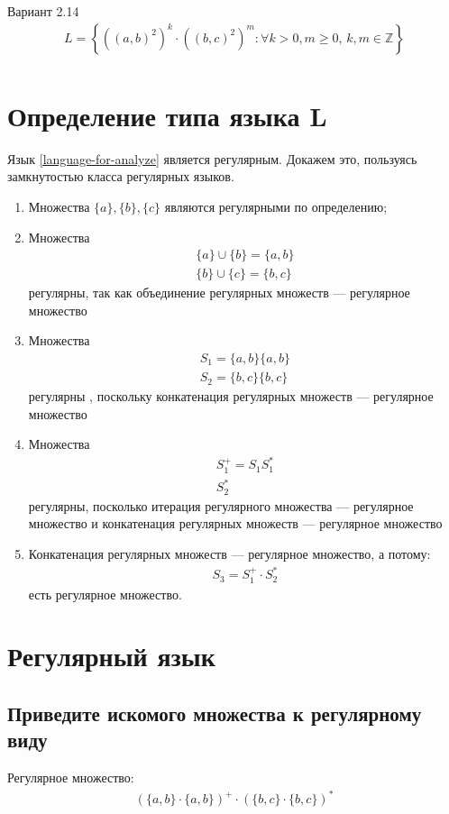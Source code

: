 Вариант 2.14
\begin{align}\label{language-for-analyze}
	L = \left\{ ((a,b)^2)^k \cdot ((b,c)^2)^m \colon \forall k > 0, m \geq 0,\, k,m \in \mathbb{Z} \right\} \\
\end{align}
\section{Определение типа языка L}
Язык \cref{language-for-analyze} является регулярным. Докажем это, пользуясь замкнутостью класса регулярных языков.
\begin{enumerate}
	\item Множества \(\{a\}, \{b\}, \{c\}\) являются регулярными по определению;
	\item Множества
	      \begin{align}
		      \{a\} \cup \{b\} =  \{a,b\} \\
		      \{b\} \cup \{c\} =  \{b,c\}
	      \end{align}
	      регулярны, так как объединение регулярных множеств --- регулярное множество
	\item Множества \begin{align}
		      S_1 = \{a, b\}\{a,b\} \\
		      S_2 = \{b, c\}\{b,c\}
	      \end{align}
	      регулярны , поскольку конкатенация регулярных множеств --- регулярное множество
	\item Множества
	      \begin{align}
		      S_1^+ = S_1 S_1^* \\
		      S_2^*
	      \end{align}
	      регулярны, посколько итерация регулярного множества --- регулярное множество и конкатенация регулярных множеств --- регулярное множество
	\item Конкатенация регулярных множеств --- регулярное множество, а потому:
	      \begin{align}
		      S_3 = S_1^+ \cdot S_2^*
	      \end{align}
	      есть регулярное множество.
\end{enumerate}
\section{Регулярный язык}
\subsection{Приведите искомого множества к регулярному виду}
Регулярное множество:
\begin{align}
	(\{a, b\}\cdot\{a, b\})^+\cdot(\{b, c\}\cdot \{b, c\})^*
\end{align}
